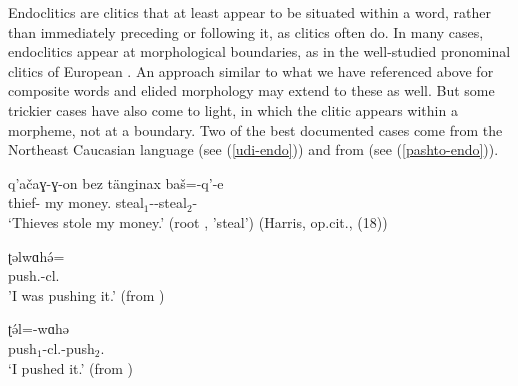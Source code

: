 \documentclass[output=paper
 	        ,biblatex
                ,babelshorthands
                ,newtxmath
                ,draftmode
                ,colorlinks, citecolor=brown
]{langscibook}
\begin{document}
Endoclitics are clitics that at least appear to be situated within a word, rather than immediately
preceding or following it, as clitics often do.
In many cases, endoclitics appear at morphological boundaries, as in the well-studied pronominal clitics of European   \citep{Crysmann2000a}. An approach similar to what we have referenced above for composite words and elided morphology may extend to these as well. But some trickier cases have also come to light, in which the clitic appears within a morpheme, not at a boundary. Two of the best documented cases come from the Northeast Caucasian language  \citep{Harris2000} (see (\ref{udi-endo})) and from  \citep{Tegey1977,Roberts2000,Dost2007} (see (\ref{pashto-endo})).

\ea
\label{udi-endo}
\gll q'a\v{c}aɣ-ɣ-on bez t\"{a}nginax ba\v{s}=-q'-e \\
     thief- my money. steal$_{1}$--steal$_{2}$- \\
\glt `Thieves stole my money.' (root , 'steal') (Harris, op.cit., (18))
\z

\eal
\label{pashto-endo}
\ex\label{pashto-endo-a}
\gll ʈəlwɑhə́= \\
     push.-cl. \\
\glt 'I was pushing it.' (from \citealt{Tegey1977,Dost2007})

\ex\label{pashto-endo-b}
\gll ʈə́l=-wɑhə \\
     push$_{1}$-cl.-push$_{2}$. \\
\glt `I pushed it.' (from \citealt{Tegey1977,Dost2007})
\zl
\end{document}
